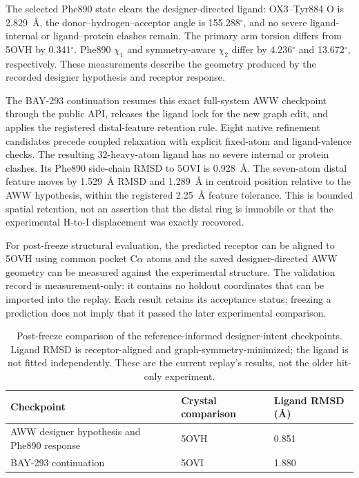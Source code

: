 \documentclass[11pt]{article}
\begin{document}
\begin{small}
The selected Phe890 state clears the designer-directed ligand: OX3--Tyr884 O is 2.829~\AA{}, the donor--hydrogen--acceptor angle is 155.288$^{\circ}$, and no severe ligand-internal or ligand--protein clashes remain. The primary arm torsion differs from 5OVH by 0.341$^{\circ}$. Phe890 $\chi_1$ and symmetry-aware $\chi_2$ differ by 4.236$^{\circ}$ and 13.672$^{\circ}$, respectively. These measurements describe the geometry produced by the recorded designer hypothesis and receptor response.

The BAY-293 continuation resumes this exact full-system AWW checkpoint through the public API, releases the ligand lock for the new graph edit, and applies the registered distal-feature retention rule. Eight native refinement candidates precede coupled relaxation with explicit fixed-atom and ligand-valence checks. The resulting 32-heavy-atom ligand has no severe internal or protein clashes. Its Phe890 side-chain RMSD to 5OVI is 0.928~\AA{}. The seven-atom distal feature moves by 1.529~\AA{} RMSD and 1.289~\AA{} in centroid position relative to the AWW hypothesis, within the registered 2.25~\AA{} feature tolerance. This is bounded spatial retention, not an assertion that the distal ring is immobile or that the experimental H-to-I displacement was exactly recovered.

For post-freeze structural evaluation, the predicted receptor can be aligned to 5OVH using common pocket C$\alpha$ atoms and the saved designer-directed AWW geometry can be measured against the experimental structure. The validation record is measurement-only: it contains no holdout coordinates that can be imported into the replay. Each result retains its acceptance status; freezing a prediction does not imply that it passed the later experimental comparison.

\begin{table}[htbp]
\centering\small
\caption{Post-freeze comparison of the reference-informed designer-intent checkpoints. Ligand RMSD is receptor-aligned and graph-symmetry-minimized; the ligand is not fitted independently. These are the current replay's results, not the older hit-only experiment.}
\label{tab:appA_sos1_eval}
\begin{tabular}{@{}lll@{}}
\toprule
\textbf{Checkpoint} & \textbf{Crystal comparison} & \textbf{Ligand RMSD (\AA{})}\\
\midrule
AWW designer hypothesis and Phe890 response & 5OVH & 0.851\\
BAY-293 continuation & 5OVI & 1.880\\
\bottomrule
\end{tabular}
\end{table}


\end{small}
\end{document}
